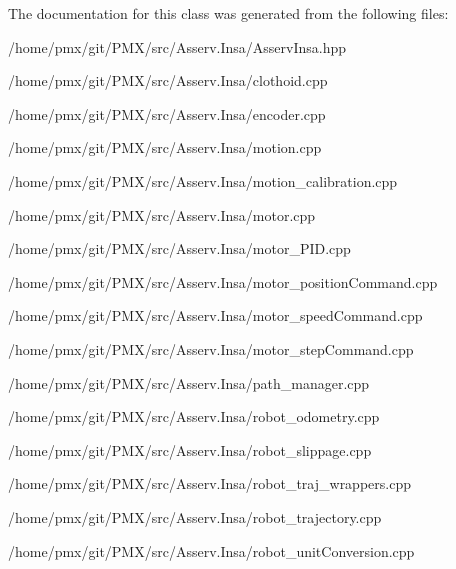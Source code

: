 The documentation for this class was generated from the following files\+:\begin{DoxyCompactItemize}
\item 
/home/pmx/git/\+P\+M\+X/src/\+Asserv.\+Insa/Asserv\+Insa.\+hpp\item 
/home/pmx/git/\+P\+M\+X/src/\+Asserv.\+Insa/clothoid.\+cpp\item 
/home/pmx/git/\+P\+M\+X/src/\+Asserv.\+Insa/encoder.\+cpp\item 
/home/pmx/git/\+P\+M\+X/src/\+Asserv.\+Insa/motion.\+cpp\item 
/home/pmx/git/\+P\+M\+X/src/\+Asserv.\+Insa/motion\+\_\+calibration.\+cpp\item 
/home/pmx/git/\+P\+M\+X/src/\+Asserv.\+Insa/motor.\+cpp\item 
/home/pmx/git/\+P\+M\+X/src/\+Asserv.\+Insa/motor\+\_\+\+P\+I\+D.\+cpp\item 
/home/pmx/git/\+P\+M\+X/src/\+Asserv.\+Insa/motor\+\_\+position\+Command.\+cpp\item 
/home/pmx/git/\+P\+M\+X/src/\+Asserv.\+Insa/motor\+\_\+speed\+Command.\+cpp\item 
/home/pmx/git/\+P\+M\+X/src/\+Asserv.\+Insa/motor\+\_\+step\+Command.\+cpp\item 
/home/pmx/git/\+P\+M\+X/src/\+Asserv.\+Insa/path\+\_\+manager.\+cpp\item 
/home/pmx/git/\+P\+M\+X/src/\+Asserv.\+Insa/robot\+\_\+odometry.\+cpp\item 
/home/pmx/git/\+P\+M\+X/src/\+Asserv.\+Insa/robot\+\_\+slippage.\+cpp\item 
/home/pmx/git/\+P\+M\+X/src/\+Asserv.\+Insa/robot\+\_\+traj\+\_\+wrappers.\+cpp\item 
/home/pmx/git/\+P\+M\+X/src/\+Asserv.\+Insa/robot\+\_\+trajectory.\+cpp\item 
/home/pmx/git/\+P\+M\+X/src/\+Asserv.\+Insa/robot\+\_\+unit\+Conversion.\+cpp\end{DoxyCompactItemize}

